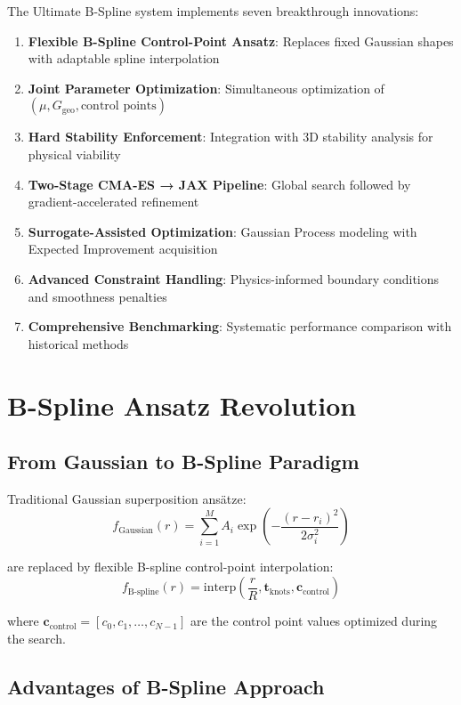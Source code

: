 \documentclass[11pt,a4paper]{article}
\begin{document}
The Ultimate B-Spline system implements seven breakthrough innovations:

\begin{enumerate}
\item \textbf{Flexible B-Spline Control-Point Ansatz}: Replaces fixed Gaussian shapes with adaptable spline interpolation
\item \textbf{Joint Parameter Optimization}: Simultaneous optimization of $(\mu, G_{\text{geo}}, \text{control points})$
\item \textbf{Hard Stability Enforcement}: Integration with 3D stability analysis for physical viability
\item \textbf{Two-Stage CMA-ES → JAX Pipeline}: Global search followed by gradient-accelerated refinement
\item \textbf{Surrogate-Assisted Optimization}: Gaussian Process modeling with Expected Improvement acquisition
\item \textbf{Advanced Constraint Handling}: Physics-informed boundary conditions and smoothness penalties
\item \textbf{Comprehensive Benchmarking}: Systematic performance comparison with historical methods
\end{enumerate}

\section{B-Spline Ansatz Revolution}

\subsection{From Gaussian to B-Spline Paradigm}

Traditional Gaussian superposition ansätze:
\begin{equation}
f_{\text{Gaussian}}(r) = \sum_{i=1}^{M} A_i \exp\left(-\frac{(r-r_i)^2}{2\sigma_i^2}\right)
\end{equation}

are replaced by flexible B-spline control-point interpolation:
\begin{equation}
f_{\text{B-spline}}(r) = \text{interp}\left(\frac{r}{R}, \mathbf{t}_{\text{knots}}, \mathbf{c}_{\text{control}}\right)
\end{equation}

where $\mathbf{c}_{\text{control}} = [c_0, c_1, \ldots, c_{N-1}]$ are the control point values optimized during the search.

\subsection{Advantages of B-Spline Approach}
\end{document}
